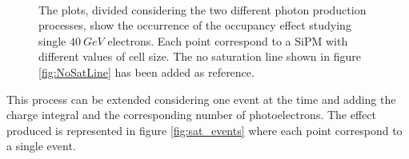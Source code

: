 \begin{figure}
	\centering
	 \\
	\caption{The plots, divided considering the two different photon production processes, show the occurrence of the occupancy effect studying single $40\ GeV$ electrons. Each point correspond to a SiPM with different values of cell size. The no saturation line shown in figure \ref{fig:NoSatLine} has been added as reference.}
	\label{fig:sat_fibres}
\end{figure}

This process can be extended considering one event at the time and adding the charge integral and the corresponding number of photoelectrons. The effect produced is represented in figure \ref{fig:sat_events} where each point correspond to a single event.\\

